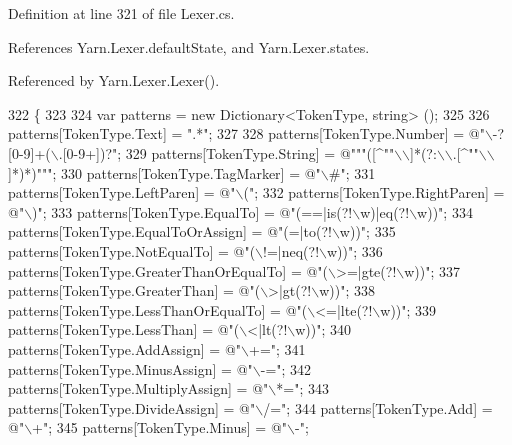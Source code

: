 Definition at line 321 of file Lexer.\-cs.



References Yarn.\-Lexer.\-default\-State, and Yarn.\-Lexer.\-states.



Referenced by Yarn.\-Lexer.\-Lexer().


\begin{DoxyCode}
322         \{
323 
324             var patterns = \textcolor{keyword}{new} Dictionary<TokenType, string> ();
325 
326             patterns[TokenType.Text] = \textcolor{stringliteral}{".*"};
327 
328             patterns[TokenType.Number] = \textcolor{stringliteral}{@"\(\backslash\)-?[0-9]+(\(\backslash\).[0-9+])?"};
329             patterns[TokenType.String] = \textcolor{stringliteral}{@"""([^""\(\backslash\)\(\backslash\)]*(?:\(\backslash\)\(\backslash\).[^""\(\backslash\)\(\backslash\)]*)*)"""};
330             patterns[TokenType.TagMarker] = \textcolor{stringliteral}{@"\(\backslash\)#"};
331             patterns[TokenType.LeftParen] = \textcolor{stringliteral}{@"\(\backslash\)("};
332             patterns[TokenType.RightParen] = \textcolor{stringliteral}{@"\(\backslash\))"};
333             patterns[TokenType.EqualTo] = \textcolor{stringliteral}{@"(==|is(?!\(\backslash\)w)|eq(?!\(\backslash\)w))"};
334             patterns[TokenType.EqualToOrAssign] = \textcolor{stringliteral}{@"(=|to(?!\(\backslash\)w))"};
335             patterns[TokenType.NotEqualTo] = \textcolor{stringliteral}{@"(\(\backslash\)!=|neq(?!\(\backslash\)w))"};
336             patterns[TokenType.GreaterThanOrEqualTo] = \textcolor{stringliteral}{@"(\(\backslash\)>=|gte(?!\(\backslash\)w))"};
337             patterns[TokenType.GreaterThan] = \textcolor{stringliteral}{@"(\(\backslash\)>|gt(?!\(\backslash\)w))"};
338             patterns[TokenType.LessThanOrEqualTo] = \textcolor{stringliteral}{@"(\(\backslash\)<=|lte(?!\(\backslash\)w))"};
339             patterns[TokenType.LessThan] = \textcolor{stringliteral}{@"(\(\backslash\)<|lt(?!\(\backslash\)w))"};
340             patterns[TokenType.AddAssign] = \textcolor{stringliteral}{@"\(\backslash\)+="};
341             patterns[TokenType.MinusAssign] = \textcolor{stringliteral}{@"\(\backslash\)-="};
342             patterns[TokenType.MultiplyAssign] = \textcolor{stringliteral}{@"\(\backslash\)*="};
343             patterns[TokenType.DivideAssign] = \textcolor{stringliteral}{@"\(\backslash\)/="};
344             patterns[TokenType.Add] = \textcolor{stringliteral}{@"\(\backslash\)+"};
345             patterns[TokenType.Minus] = \textcolor{stringliteral}{@"\(\backslash\)-"};

\end{DoxyCode}
